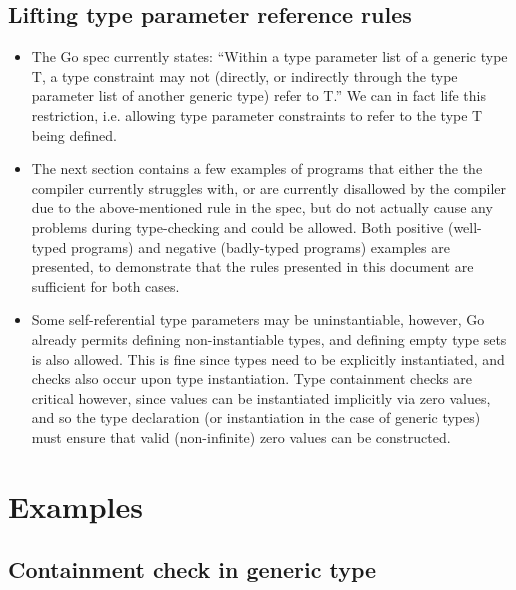 \documentclass[12pt]{article}
\begin{document}

\subsection{Lifting type parameter reference rules}

\begin{itemize}
    \item The Go spec currently states: ``Within a type parameter list of a
          generic type T, a type constraint may not (directly, or indirectly
          through the type parameter list of another generic type) refer to T.''
          We can in fact life this restriction, i.e. allowing type parameter
          constraints to refer to the type T being defined.
    \item The next section contains a few examples of programs that either the
          the compiler currently struggles with, or are currently disallowed by
          the compiler due to the above-mentioned rule in the spec, but do not
          actually cause any problems during type-checking and could be allowed.
          Both positive (well-typed programs) and negative (badly-typed
          programs) examples are presented, to demonstrate that the rules
          presented in this document are sufficient for both cases.
    \item Some self-referential type parameters may be uninstantiable, however,
          Go already permits defining non-instantiable types, and defining empty
          type sets is also allowed. This is fine since types need to be
          explicitly instantiated, and checks also occur upon type
          instantiation. Type containment checks are critical however, since
          values can be instantiated implicitly via zero values, and so the type
          declaration (or instantiation in the case of generic types) must
          ensure that valid (non-infinite) zero values can be constructed.
\end{itemize}


\section{Examples}

\subsection{Containment check in generic type}
\end{document}
